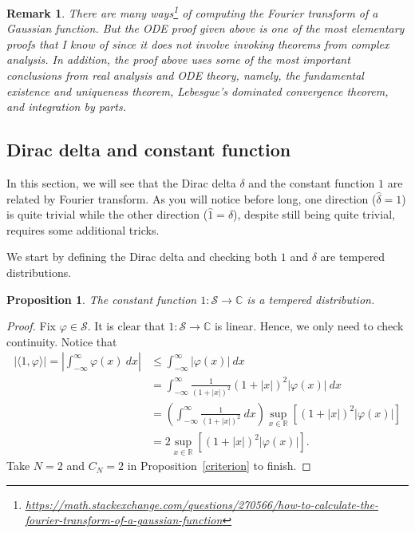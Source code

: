 \documentclass[12pt, letterpaper]{article}
\theoremstyle{plain}
\newtheorem{proposition}[theorem]{Proposition}
\newtheorem{remark}[theorem]{Remark}
\renewcommand{\phi}{\varphi}
\begin{document}
\begin{remark}
    There are many ways\footnote{\href{https://math.stackexchange.com/questions/270566/how-to-calculate-the-fourier-transform-of-a-gaussian-function}{https://math.stackexchange.com/questions/270566/how-to-calculate-the-fourier-transform-of-a-gaussian-function}} of computing the Fourier transform of a Gaussian function. But the ODE proof given above is one of the most elementary proofs that I know of since it does not involve invoking theorems from complex analysis. In addition, the proof above uses some of the most important conclusions from real analysis and ODE theory, namely, the fundamental existence and uniqueness theorem, Lebesgue's dominated convergence theorem, and integration by parts.
\end{remark}

\subsection{Dirac delta and constant function}\label{sec33}

In this section, we will see that the Dirac delta $\delta$ and the constant function $1$ are related by Fourier transform. As you will notice before long, one direction ($\hat{\delta} = 1$) is quite trivial while the other direction ($\hat{1} = \delta$), despite still being quite trivial, requires some additional tricks. 

We start by defining the Dirac delta and checking both $1$ and $\delta$ are tempered distributions.

\begin{proposition}\label{const}
    The constant function $1: \mathcal{S} \to \mathbb{C}$ is a tempered distribution.
\end{proposition}

\begin{proof}
    Fix $\phi \in \mathcal{S}$. It is clear that $1: \mathcal{S} \to \mathbb{C}$ is linear. Hence, we only need to check continuity. Notice that 
    \begin{align}
        \vert \langle 1, \phi \rangle \vert = \left \vert \int_{-\infty}^\infty \phi(x) \ dx \right \vert & \le \int_{-\infty}^\infty \vert \phi(x) \vert \ dx \\
        & = \int_{-\infty}^\infty \frac{1}{(1+|x|)^2}(1+|x|)^2 \vert \phi(x) \vert \ dx \\
        & = \left ( \int_{-\infty}^\infty \frac{1}{(1+|x|)^2} \ dx \right ) \sup_{x \in \mathbb{R}} [(1+|x|)^2 \vert \phi(x) \vert] \\
        & = 2 \sup_{x \in \mathbb{R}} [(1+|x|)^2 \vert \phi(x) \vert].
    \end{align}
    Take $N = 2$ and $C_N = 2$ in Proposition~\ref{criterion} to finish.
\end{proof}
\end{document}
